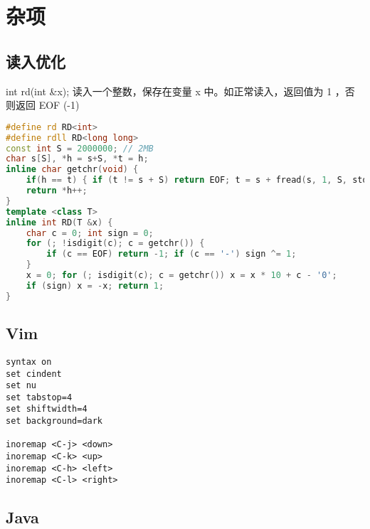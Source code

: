 \documentclass[landscape,a4paper]{article}
\begin{document}
\section{杂项}

\subsection{读入优化}

int rd(int \&x); 读入一个整数，保存在变量 x 中。如正常读入，返回值为 1 ，否则返回 EOF (-1)

\begin{lstlisting}[language=C++]
#define rd RD<int>
#define rdll RD<long long>
const int S = 2000000; // 2MB
char s[S], *h = s+S, *t = h;
inline char getchr(void) {
	if(h == t) { if (t != s + S) return EOF; t = s + fread(s, 1, S, stdin); h = s; }
	return *h++;
}
template <class T>
inline int RD(T &x) {
	char c = 0; int sign = 0;
	for (; !isdigit(c); c = getchr()) {
		if (c == EOF) return -1; if (c == '-') sign ^= 1;
	}
	x = 0; for (; isdigit(c); c = getchr()) x = x * 10 + c - '0';
	if (sign) x = -x; return 1;
}
\end{lstlisting}

\subsection{Vim}

\begin{lstlisting}
syntax on
set cindent
set nu
set tabstop=4
set shiftwidth=4
set background=dark

inoremap <C-j> <down>
inoremap <C-k> <up>
inoremap <C-h> <left>
inoremap <C-l> <right>
\end{lstlisting}

\subsection{Java}
\end{document}
